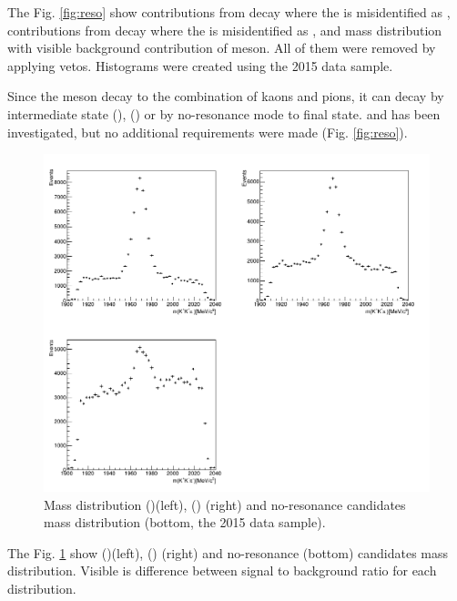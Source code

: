 The Fig. \ref{fig:reso} show contributions from \Lc decay where the \proton is misidentified as \kaon , contributions from \Dz decay where the \pion is misidentified as \kaon, \kaon\pion and \kaon\kaon mass distribution with visible background contribution of \Dz meson. All of them were removed by applying vetos. Histograms were created using the 2015 data sample. 

 Since the \Ds meson decay to the combination of kaons and pions, it can decay by intermediate state \Ds\to(\Pphi\to\Kp\Km)\pip,  \Ds\to \Kp(\Kstarz\to\Km\pip) or by no-resonance mode to \Kp\pim\pip final state. \Pphi and \Kstarz has been investigated, but no additional requirements were made (Fig. \ref{fig:reso}). 

\begin{figure}[h!]
\includegraphics[width=14cm]{figs/Selection/D_reso.png}
\centering
\caption{Mass distribution \Ds\to(\Pphi\to\Kp\Km)\pip (left), \Ds\to \Kp(\Kstarz\to\Km\pip) (right) and no-resonance \Kp\pim\pip candidates mass distribution (bottom, the 2015 data sample).}
\label{fig:D_reso}
\end{figure}
 
The Fig. \ref{fig:D_reso} show \Ds\to(\Pphi\to\Kp\Km)\pip (left), \Ds\to \Kp(\Kstarz\to\Km\pip) (right) and no-resonance \Kp\pim\pip (bottom) candidates mass distribution. Visible is difference between signal to background ratio for each distribution. 

